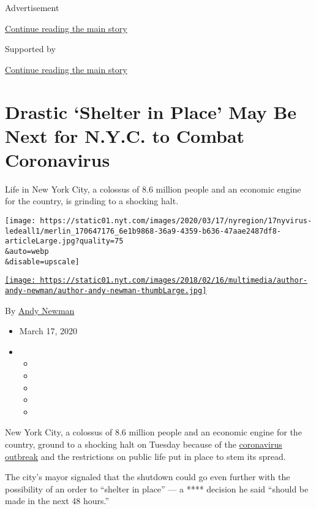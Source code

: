 Advertisement

\protect\hyperlink{after-top}{Continue reading the main story}

Supported by

\protect\hyperlink{after-sponsor}{Continue reading the main story}

\hypertarget{drastic-shelter-in-place-may-be-next-for-nyc-to-combat-coronavirus}{%
\section{Drastic `Shelter in Place' May Be Next for N.Y.C. to Combat
Coronavirus}\label{drastic-shelter-in-place-may-be-next-for-nyc-to-combat-coronavirus}}

Life in New York City, a colossus of 8.6 million people and an economic
engine for the country, is grinding to a shocking halt.

\texttt{[image: https://static01.nyt.com/images/2020/03/17/nyregion/17nyvirus-ledeall1/merlin\_170647176\_6e1b9868-36a9-4359-b636-47aae2487df8-articleLarge.jpg?quality=75\\\&auto=webp\\\&disable=upscale]}

\href{https://www.nytimes.com/by/andy-newman}{\texttt{[image: https://static01.nyt.com/images/2018/02/16/multimedia/author-andy-newman/author-andy-newman-thumbLarge.jpg]}}

By \href{https://www.nytimes.com/by/andy-newman}{Andy Newman}

\begin{itemize}
\item
  March 17, 2020
\item
  \begin{itemize}
  \item
  \item
  \item
  \item
  \item
  \end{itemize}
\end{itemize}

New York City, a colossus of 8.6 million people and an economic engine
for the country, ground to a shocking halt on Tuesday because of the
\href{https://www.nytimes.com/2020/03/18/podcasts/the-daily/cuomo-new-york-coronavirus.html?action=click\&module=Briefings\&pgtype=Homepage}{coronavirus
outbreak} and the restrictions on public life put in place to stem its
spread.

The city's mayor signaled that the shutdown could go even further with
the possibility of an order to ``shelter in place'' --- a **** decision
he said ``should be made in the next 48 hours.''

